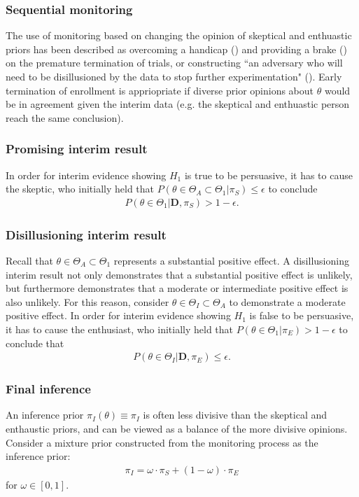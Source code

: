 \documentclass[12pt]{article}
\begin{document}
\subsubsection{Sequential monitoring}
The use of monitoring based on changing the opinion of skeptical and enthuastic priors has been described as overcoming a handicap (\cite{Freedman1989}) and providing a brake (\cite{Fayers1997}) on the premature termination of trials, or constructing ``an adversary who will need to be disillusioned by the data to stop further experimentation" (\cite{Spiegelhalter1994}). Early termination of enrollment is appriopriate if diverse prior opinions about $\theta$ would be in agreement given the interim data (e.g. the skeptical and enthuastic person reach the same conclusion). 

\subsubsection*{Promising interim result}
In order for interim evidence showing $H_1$ is true to be persuasive, it has to cause the skeptic, who initially held that $P(\theta\in\Theta_A\subset\Theta_1| \pi_{S})\leq\epsilon$ to conclude 
\begin{align}
P(\theta\in\Theta_1| \mathbf{D},\pi_{S})>1-\epsilon.
\end{align}
\subsubsection*{Disillusioning interim result}
Recall that $\theta\in\Theta_A\subset\Theta_1$ represents a substantial positive effect. A disillusioning interim result not only demonstrates that a substantial positive effect is unlikely, but furthermore demonstrates that a moderate or intermediate positive effect is also unlikely. For this reason, consider $\theta\in\Theta_I\subset\Theta_A$ to demonstrate a moderate positive effect. In order for interim evidence showing $H_1$ is false to be persuasive, it has to cause the enthusiast, who initially held that $P(\theta\in\Theta_1| \pi_{E})>1-\epsilon$ to conclude that 
\begin{align}
P(\theta\in\Theta_I| \mathbf{D},\pi_{E})\leq\epsilon.
\end{align}

\subsubsection{Final inference}
An inference prior $\pi_{I}(\theta)\equiv\pi_{I}$ is often less divisive than the skeptical and enthaustic priors, and can be viewed as a balance of the more divisive opinions. Consider a mixture prior constructed from the monitoring process as the inference prior:
\begin{align}
\pi_{I}=\omega\cdot\pi_{S}+(1-\omega)\cdot\pi_E
\end{align}
for $\omega\in[0,1]$. 
\end{document}
